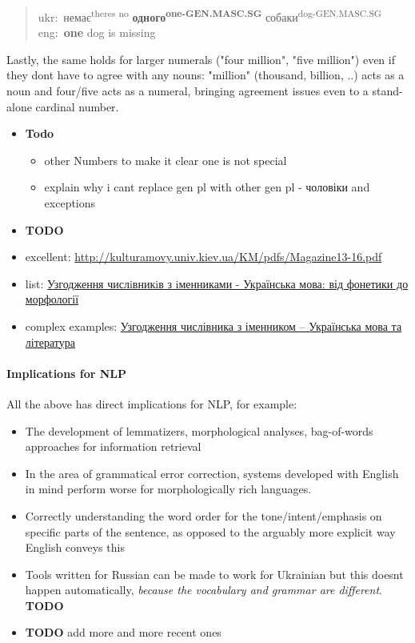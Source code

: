 \begin{quote}
ukr: немає\textsuperscript{there\textquotesingle s no}
\textbf{одного\textsuperscript{one-GEN.MASC.SG}}
собаки\textsuperscript{dog-GEN.MASC.SG}\\
eng: \textbf{one} dog is missing
\end{quote}

Lastly, the same holds for larger numerals ("four million", "five
million") even if they don\textquotesingle t have to agree with any
nouns: "million" (thousand, billion, ..) acts as a noun and four/five
acts as a numeral, bringing agreement issues even to a stand-alone
cardinal number.

\begin{itemize}
\item
  \textbf{Todo}

  \begin{itemize}
  \tightlist
  \item
    other Numbers to make it clear one is not special
  \item
    explain why i can\textquotesingle t replace gen pl with other gen pl
    - чоловіки and exceptions
  \end{itemize}
\item
  \textbf{TODO}
\item
  excellent:
  \url{http://kulturamovy.univ.kiev.ua/KM/pdfs/Magazine13-16.pdf}
\item
  list:
  \href{https://ukr.ed-era.com/chislivnik/uzgodzennya_chislivnikiv_z_imennikami}{Узгодження
  числiвникiв з iменниками - Українська мова: від фонетики до
  морфології}
\item
  complex examples: \href{https://zno.if.ua/?p=3542}{Узгодження
  числівника з іменником -- Українська мова та література}
\end{itemize}

\paragraph{Implications for NLP}\label{implications-for-nlp}

All the above has direct implications for NLP, for example:

\begin{itemize}
\tightlist
\item
  The development of lemmatizers, morphological analyses, bag-of-words
  approaches for information retrieval\cite{bender}
\item
  In the area of grammatical error correction, systems developed with
  English in mind perform worse for morphologically rich languages.
  \cite{Syvokon2022}
\item
  Correctly understanding the word order for the tone/intent/emphasis on
  specific parts of the sentence, as opposed to the arguably more
  explicit way English conveys this
\item
  Tools written for Russian can be made to work for Ukrainian but this
  doesn\textquotesingle t happen automatically, \emph{because the
  vocabulary and grammar are different}. \textbf{TODO}
\item
  \textbf{TODO} add more and more recent ones
\end{itemize}

